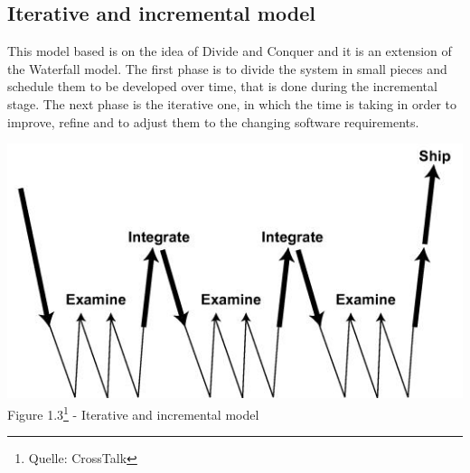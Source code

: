 \subsection{Iterative and incremental model}
This model based is on the idea of Divide and Conquer and it is an extension of the Waterfall model. The first phase is to divide the system in small pieces and schedule them to be developed over time, that is done during the incremental stage. The next phase is the iterative one, in which the time is taking in order to improve, refine and to adjust them to the changing software requirements.
\begin{center}
\includegraphics[scale=0.75]{Images/Iterative_development_model.png}\\
Figure 1.3\footnote{Quelle: CrossTalk} - Iterative and incremental model
\end{center}
